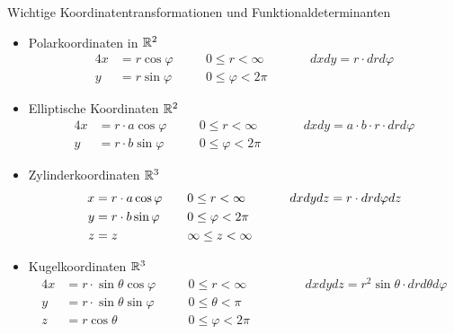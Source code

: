\begin{Rechenregeln}{Wichtige Koordinatentransformationen und Funktionaldeterminanten}{}
    \begin{itemize}
       \item Polarkoordinaten in $\mathbb{R}^2$ \begin{alignat*}{4}
            x &= r \cos \varphi\quad &&0 \leq r < \infty\quad &&&dxdy = r \cdot drd\varphi\\
            y &= r \sin \varphi\quad &&0 \leq \varphi < 2\pi\quad
        \end{alignat*}
        \item Elliptische Koordinaten $\mathbb{R}^2$ \begin{alignat*}{4}
            x &= r \cdot  a \cos \varphi\quad &&0 \leq r < \infty\quad &&&dxdy = a \cdot b \cdot  r \cdot drd\varphi\\
            y &= r \cdot b \sin \varphi\quad &&0 \leq \varphi < 2\pi\quad
        \end{alignat*}
        \item Zylinderkoordinaten $\mathbb{R}^3$ \begin{alignat*}{4}
            x &= r \cdot  a \cos \varphi\quad &&0 \leq r < \infty\quad &&&dxdydz = r \cdot drd\varphi dz\\
            y &= r \cdot b \sin \varphi\quad &&0 \leq \varphi < 2\pi\quad\\
            z &= z\quad &&\-\infty \leq z < \infty\quad
        \end{alignat*}
        \item Kugelkoordinaten $\mathbb{R}^3$ \begin{alignat*}{4}
            x &= r \cdot \sin \theta \cos \varphi \quad &&0 \leq r < \infty\quad &&&dxdydz = r^2 \sin \theta \cdot drd\theta d\varphi\\
            y &= r \cdot \sin \theta \sin \varphi \quad && 0 \leq \theta < \pi\quad\\
            z &= r \cos \theta \quad &&0 \leq \varphi < 2\pi\quad\quad
        \end{alignat*}
   \end{itemize}
\end{Rechenregeln}